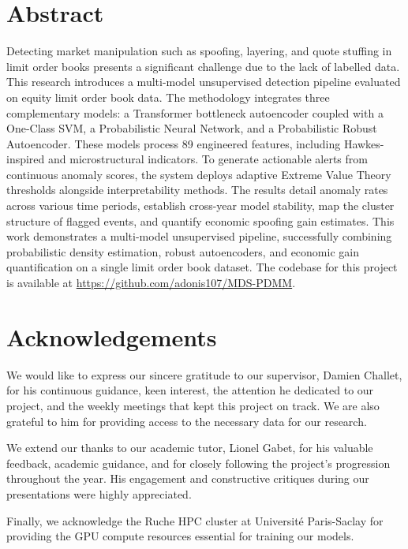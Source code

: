 \documentclass[11pt]{report}
\begin{document}
\chapter*{Abstract}
Detecting market manipulation such as spoofing, layering, and quote stuffing in limit order books presents a significant challenge due to the lack of labelled data. This research introduces a multi-model unsupervised detection pipeline evaluated on equity limit order book data. The methodology integrates three complementary models: a Transformer bottleneck autoencoder coupled with a One-Class SVM, a Probabilistic Neural Network, and a Probabilistic Robust Autoencoder. These models process 89 engineered features, including Hawkes-inspired and microstructural indicators. To generate actionable alerts from continuous anomaly scores, the system deploys adaptive Extreme Value Theory thresholds alongside interpretability methods. The results detail anomaly rates across various time periods, establish cross-year model stability, map the cluster structure of flagged events, and quantify economic spoofing gain estimates. This work demonstrates a multi-model unsupervised pipeline, successfully combining probabilistic density estimation, robust autoencoders, and economic gain quantification on a single limit order book dataset. The codebase for this project is available at \url{https://github.com/adonis107/MDS-PDMM}.


\chapter*{Acknowledgements}
We would like to express our sincere gratitude to our supervisor, Damien Challet, for his continuous guidance, keen interest, the attention he dedicated to our project, and the weekly meetings that kept this project on track. We are also grateful to him for providing access to the necessary data for our research.

We extend our thanks to our academic tutor, Lionel Gabet, for his valuable feedback, academic guidance, and for closely following the project's progression throughout the year. His engagement and constructive critiques during our presentations were highly appreciated.

Finally, we acknowledge the Ruche HPC cluster at Université Paris-Saclay for providing the GPU compute resources essential for training our models.
\end{document}
